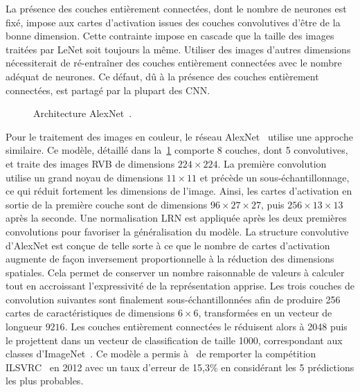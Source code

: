 La présence des couches entièrement connectées, dont le nombre de neurones est fixé, impose aux cartes d'activation issues des couches convolutives d'être de la bonne dimension. Cette contrainte impose en cascade que la taille des images traitées par LeNet soit toujours la même. Utiliser des images d'autres dimensions nécessiterait de ré-entraîner des couches entièrement connectées avec le nombre adéquat de neurones. Ce défaut, dû à la présence des couches entièrement connectées, est partagé par la plupart des \gls{CNN}.

\begin{figure}[t]
  \resizebox{\textwidth}{!}{
    
  }
  \caption[Architecture AlexNet]{Architecture AlexNet~\cite{krizhevsky_imagenet_2012}.}
  \label{fig:alexnet}
\end{figure}

Pour le traitement des images en couleur, le réseau AlexNet~\cite{krizhevsky_imagenet_2012} utilise une approche similaire. Ce modèle, détaillé dans la~\cref{fig:alexnet} comporte 8 couches, dont 5 convolutives, et traite des images \gls{RVB} de dimensions $224\times224$. La première convolution utilise un grand noyau de dimensions $11\times11$ et précède un sous-échantillonnage, ce qui réduit fortement les dimensions de l'image. Ainsi, les cartes d'activation en sortie de la première couche sont de dimensions $96\times27\times27$, puis $256\times13\times13$ après la seconde. Une normalisation \gls{LRN} est appliquée après les deux premières convolutions pour favoriser la généralisation du modèle. La structure convolutive d'AlexNet est conçue de telle sorte à ce que le nombre de cartes d'activation augmente de façon inversement proportionnelle à la réduction des dimensions spatiales. Cela permet de conserver un nombre raisonnable de valeurs à calculer tout en accroissant l'expressivité de la représentation apprise. Les trois couches de convolution suivantes sont finalement sous-échantillonnées afin de produire 256 cartes de caractéristiques de dimensions $6\times6$, transformées en un vecteur de longueur $9216$.
Les couches entièrement connectées le réduisent alors à 2048 puis le projettent dans un vecteur de classification de taille 1000, correspondant aux classes d'ImageNet~\cite{deng_imagenet_2009}. Ce modèle a permis à~\citet{krizhevsky_imagenet_2012} de remporter la compétition \gls{ILSVRC}~\cite{russakovsky_imagenet_2015} en 2012 avec un taux d'erreur de 15,3\% en considérant les 5 prédictions les plus probables.

